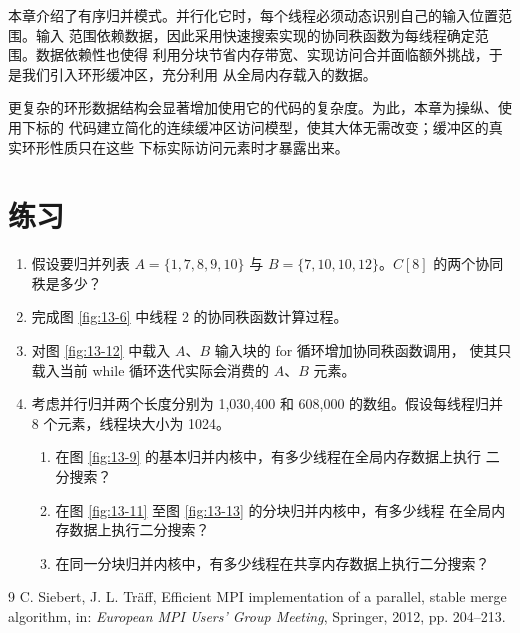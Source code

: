 本章介绍了有序归并模式。并行化它时，每个线程必须动态识别自己的输入位置范围。输入
范围依赖数据，因此采用快速搜索实现的协同秩函数为每线程确定范围。数据依赖性也使得
利用分块节省内存带宽、实现访问合并面临额外挑战，于是我们引入环形缓冲区，充分利用
从全局内存载入的数据。

更复杂的环形数据结构会显著增加使用它的代码的复杂度。为此，本章为操纵、使用下标的
代码建立简化的连续缓冲区访问模型，使其大体无需改变；缓冲区的真实环形性质只在这些
下标实际访问元素时才暴露出来。

\section*{练习}

\begin{enumerate}[label=\arabic*.,leftmargin=2.7em]
  \item 假设要归并列表
  $A=\{1,7,8,9,10\}$ 与 $B=\{7,10,10,12\}$。$C[8]$ 的两个协同秩是多少？

  \item 完成图 \ref{fig:13-6} 中线程 2 的协同秩函数计算过程。

  \item 对图 \ref{fig:13-12} 中载入 $A$、$B$ 输入块的 for 循环增加协同秩函数调用，
  使其只载入当前 while 循环迭代实际会消费的 $A$、$B$ 元素。

  \item 考虑并行归并两个长度分别为 1,030,400 和 608,000 的数组。假设每线程归并
  8 个元素，线程块大小为 1024。
  \begin{enumerate}[label=\alph*.,leftmargin=2.2em]
    \item 在图 \ref{fig:13-9} 的基本归并内核中，有多少线程在全局内存数据上执行
    二分搜索？
    \item 在图 \ref{fig:13-11} 至图 \ref{fig:13-13} 的分块归并内核中，有多少线程
    在全局内存数据上执行二分搜索？
    \item 在同一分块归并内核中，有多少线程在共享内存数据上执行二分搜索？
  \end{enumerate}
\end{enumerate}

\begin{chapterbibliography}{9}
  C. Siebert, J. L. Träff, Efficient MPI implementation of a parallel,
  stable merge algorithm, in: \emph{European MPI Users' Group Meeting},
  Springer, 2012, pp. 204--213.
\end{chapterbibliography}
